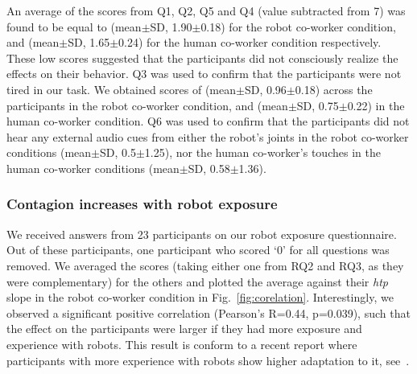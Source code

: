 \documentclass[a4paper, 12pt, oneside]{Thesis}  %
\begin{document}
An average of the scores from Q1, Q2, Q5 and Q4 (value subtracted from 7) was found to be equal to (mean$\pm$SD, 1.90$\pm$0.18) for the robot co-worker condition, and (mean$\pm$SD, 1.65$\pm$0.24) for the human co-worker condition respectively. These low scores suggested that the participants did not consciously realize the effects on their behavior. Q3 was used to confirm that the participants were not tired in our task. We obtained scores of (mean$\pm$SD, 0.96$\pm$0.18) across the participants in the robot co-worker condition, and (mean$\pm$SD, 0.75$\pm$0.22) in the human co-worker condition. Q6 was used to confirm that the participants did not hear any external audio cues from either the robot's joints in the robot co-worker conditions (mean$\pm$SD, 0.5$\pm$1.25), nor the human co-worker's touches in the human co-worker conditions (mean$\pm$SD, 0.58$\pm$1.36).

\subsubsection{Contagion increases with robot exposure}

We received answers from 23 participants on our robot exposure questionnaire. Out of these participants, one participant who scored `0' for all questions was removed. We averaged the scores (taking either one from RQ2 and RQ3, as they were complementary) for the others and plotted the average against their {\it htp} slope in the robot co-worker condition in Fig.~\ref{fig:corelation}. Interestingly, we observed a significant positive correlation (Pearson's R=0.44, p=0.039), such that the effect on the participants were larger if they had more exposure and experience with robots. This result is conform to a recent report where participants with more experience with robots show higher adaptation to it, see~\cite{vannucci:roman:2017}.
\end{document}
